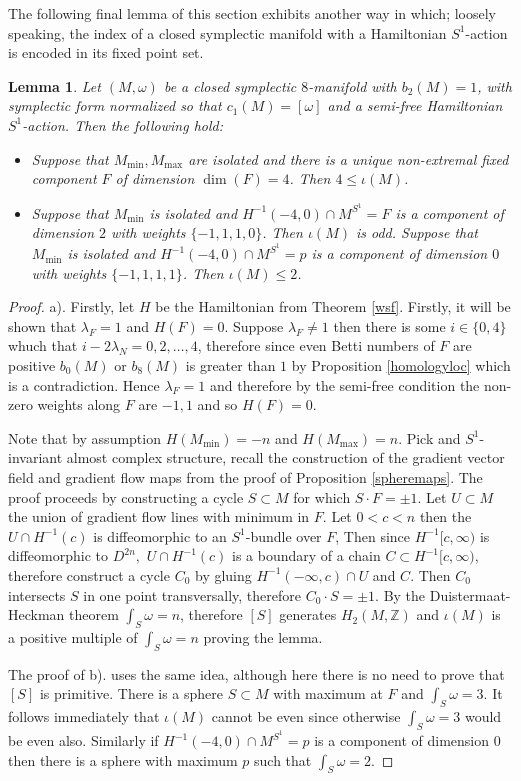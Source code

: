 \documentclass[12pt]{article}
\newtheorem{lemma}[theorem]{Lemma}
\begin{document}
The following final lemma of this section exhibits another way in which; loosely speaking, the index of a closed symplectic manifold with a Hamiltonian $S^1$-action is encoded in its fixed point set. 
\begin{lemma} \label{sphereindex}
Let $(M,\omega)$ be a closed symplectic $8$-manifold with $b_{2}(M)=1$, with symplectic form normalized so that $c_{1}(M)=[\omega]$ and a semi-free Hamiltonian $S^1$-action. Then the following hold:\begin{itemize} \item Suppose that $M_{\min},M_{\max}$ are isolated and there is a unique non-extremal fixed component $F$ of dimension $\dim(F) =4$. Then $4 \leq \iota(M)$.

\item   Suppose that $M_{\min}$ is isolated and $H^{-1}(-4,0) \cap M^{S^1} =F$ is a component of dimension $2$ with weights $\{-1,1,1,0\}$. Then $\iota(M)$ is odd. Suppose that $M_{\min}$ is isolated and $H^{-1}(-4,0) \cap M^{S^1} =p$ is a component of dimension $0$ with weights $\{-1,1,1,1\}$. Then $\iota(M) \leq 2$.  \end{itemize}
\end{lemma}
\begin{proof}
a). Firstly, let $H$ be the Hamiltonian from Theorem \ref{wsf}. Firstly, it will be shown that $\lambda_{F} = 1$ and $H(F)=0$. Suppose $\lambda_{F} \neq 1$ then there is some $i \in \{0,4\}$ whuch that $i-2\lambda_{N} =0,2, \ldots, 4$, therefore since even Betti numbers of $F$ are positive $b_{0}(M)$ or $b_{8}(M)$ is greater than $1$ by Proposition \ref{homologyloc} which is a contradiction. Hence $\lambda_{F}=1$ and therefore by the semi-free condition the non-zero weights along $F$ are $-1,1$ and so $H(F)=0$. 

Note that by assumption $H(M_{\min})=-n$ and $H(M_{\max})=n$. Pick and $S^1$-invariant almost complex structure, recall the construction of the gradient vector field and gradient flow maps from the proof of Proposition \ref{spheremaps}. The proof proceeds by constructing a cycle $S \subset M$ for which $S \cdot F = \pm 1$. Let $U \subset M$ the union of gradient flow lines with minimum in $F$. Let $0<c< n$ then the $U \cap H^{-1}(c)$ is diffeomorphic to an $S^1$-bundle over $F$,  Then since $H^{-1}[c,\infty)$ is diffeomorphic to $D^{2n},$  $U \cap H^{-1}(c)$ is a boundary of a chain $C \subset H^{-1}[c,\infty)$, therefore construct a cycle  $C_0$ by gluing $H^{-1}(-\infty, c) \cap U$ and $C$. Then  $C_0$ intersects $S$ in one point transversally, therefore $C_0 \cdot S = \pm1$. By the Duistermaat-Heckman theorem $\int_{S} \omega =n$, therefore $[S]$ generates $H_{2}(M,\mathbb{Z})$ and $\iota(M)$ is a positive multiple of $\int_{S} \omega = n$ proving the lemma.

The proof of b). uses the same idea, although here there is no need to prove that $[S]$ is primitive. There is a sphere $S \subset M$ with maximum at $F$ and $\int_{S} \omega =3$. It follows immediately that $\iota(M)$ cannot be even since otherwise  $\int_{S} \omega =3$ would be even also. Similarly if $H^{-1}(-4,0) \cap M^{S^1} =p$ is a component of dimension $0$ then there is a sphere with maximum $p$ such that $\int_{S} \omega =2$.
 \end{proof}
\end{document}
